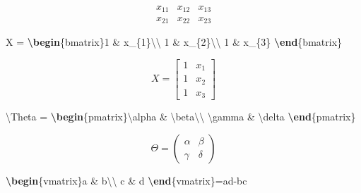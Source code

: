 \documentclass[
  12pt,
]{krantz}
\newenvironment{Shaded}{\begin{snugshade}}{\end{snugshade}}
\newcommand{\ExtensionTok}[1]{#1}
\newcommand{\KeywordTok}[1]{\textcolor[rgb]{0.13,0.29,0.53}{\textbf{#1}}}
\newcommand{\NormalTok}[1]{#1}
\newcommand{\SpecialCharTok}[1]{\textcolor[rgb]{0.00,0.00,0.00}{#1}}
\newcommand{\SpecialStringTok}[1]{\textcolor[rgb]{0.31,0.60,0.02}{#1}}
\theoremstyle{definition}
\theoremstyle{definition}
\theoremstyle{definition}
\theoremstyle{definition}
\theoremstyle{remark}
\begin{document}
\[\begin{array}{ccc}
x_{11} & x_{12} & x_{13}\\
x_{21} & x_{22} & x_{23}
\end{array}\]

\begin{Shaded}
\begin{Highlighting}[]
\SpecialStringTok{$$X = }\KeywordTok{\textbackslash{}begin}\NormalTok{\{}\ExtensionTok{bmatrix}\NormalTok{\}}\SpecialStringTok{1 \& x\_\{1\}}\SpecialCharTok{\textbackslash{}\textbackslash{}}
\SpecialStringTok{1 \& x\_\{2\}}\SpecialCharTok{\textbackslash{}\textbackslash{}}
\SpecialStringTok{1 \& x\_\{3\}}
\KeywordTok{\textbackslash{}end}\NormalTok{\{}\ExtensionTok{bmatrix}\NormalTok{\}}\SpecialStringTok{$$}
\end{Highlighting}
\end{Shaded}

\[X = \begin{bmatrix}1 & x_{1}\\
1 & x_{2}\\
1 & x_{3}
\end{bmatrix}\]

\begin{Shaded}
\begin{Highlighting}[]
\SpecialStringTok{$$}\SpecialCharTok{\textbackslash{}Theta}\SpecialStringTok{ = }\KeywordTok{\textbackslash{}begin}\NormalTok{\{}\ExtensionTok{pmatrix}\NormalTok{\}}\SpecialCharTok{\textbackslash{}alpha}\SpecialStringTok{ \& }\SpecialCharTok{\textbackslash{}beta\textbackslash{}\textbackslash{}}
\SpecialCharTok{\textbackslash{}gamma}\SpecialStringTok{ \& }\SpecialCharTok{\textbackslash{}delta}
\KeywordTok{\textbackslash{}end}\NormalTok{\{}\ExtensionTok{pmatrix}\NormalTok{\}}\SpecialStringTok{$$}
\end{Highlighting}
\end{Shaded}

\[\Theta = \begin{pmatrix}\alpha & \beta\\
\gamma & \delta
\end{pmatrix}\]

\begin{Shaded}
\begin{Highlighting}[]
\SpecialStringTok{$$}\KeywordTok{\textbackslash{}begin}\NormalTok{\{}\ExtensionTok{vmatrix}\NormalTok{\}}\SpecialStringTok{a \& b}\SpecialCharTok{\textbackslash{}\textbackslash{}}
\SpecialStringTok{c \& d}
\KeywordTok{\textbackslash{}end}\NormalTok{\{}\ExtensionTok{vmatrix}\NormalTok{\}}\SpecialStringTok{=ad{-}bc$$}
\end{Highlighting}
\end{Shaded}
\end{document}

